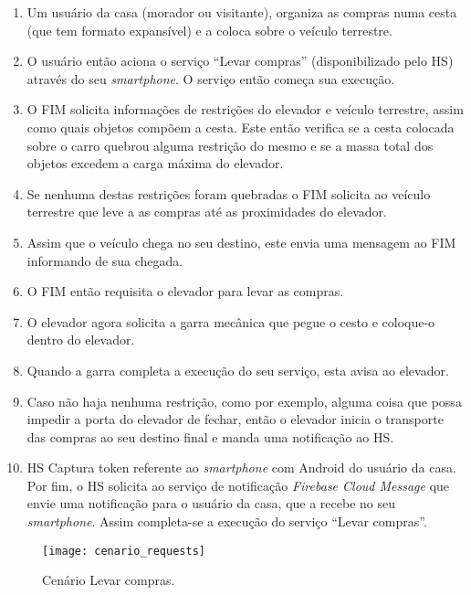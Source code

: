 \begin{enumerate}
\item Um usuário da casa (morador ou visitante), organiza as compras numa cesta (que tem formato expansível) e a coloca sobre o veículo terrestre.
\item O usuário então aciona o serviço ``Levar compras'' (disponibilizado pelo HS) através do seu \textit{smartphone}. O serviço então começa sua execução.
\item O FIM solicita informações de restrições do elevador e veículo terrestre, assim como quais objetos compõem a cesta. Este então verifica se a cesta colocada sobre o carro quebrou alguma restrição do mesmo e se a massa total dos objetos excedem a carga máxima do elevador.
\item Se nenhuma destas restrições foram quebradas o FIM solicita ao veículo terrestre que leve a as compras até as proximidades do elevador.
\item Assim que o veículo chega no seu destino, este envia uma mensagem ao FIM informando de sua chegada.
\item O FIM então requisita o elevador para levar as compras.
\item O elevador agora solicita a garra mecânica que pegue o cesto e coloque-o dentro do elevador.
\item Quando a garra completa a execução do seu serviço, esta avisa ao elevador.
\item Caso não haja nenhuma restrição, como por exemplo, alguma coisa que possa impedir a porta do elevador de fechar, então o elevador inicia o transporte das compras ao seu destino final e manda uma notificação ao HS.
\item HS Captura token referente ao \textit{smartphone} com Android\footnotemark {} do usuário da casa. Por fim, o HS solicita ao serviço de notificação \textit{Firebase Cloud Message}\footnotemark {} que envie uma notificação para o usuário da casa, que a recebe no seu \textit{smartphone}. Assim completa-se a execução do serviço ``Levar compras''.
\end{enumerate}
        
\begin{figure}[!htb] \centering 
  \centering
  \texttt{[image: cenario\_requests]} 
  \caption{Cenário Levar compras.} 
  \label{fig:cenario}
\end{figure}

